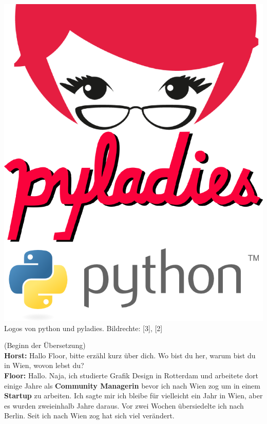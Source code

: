 \documentclass[10pt,a4paper,ngerman,twoside]{article} %
\begin{document}
\begin{multicols}{3}
\begin{center}
\includegraphics[width=\linewidth]{floor/floorlogo.png} \\
\footnotesize{Logos von python und pyladies. Bildrechte: [3], [2]}
\end{center}

(Beginn der Übersetzung) \\
\textbf{Horst:} Hallo Floor, bitte erzähl kurz über dich. Wo bist du her, warum bist du in Wien, wovon lebst du? \\
\textbf{Floor:} Hallo. Naja, ich studierte Grafik Design in Rotterdam und arbeitete dort einige Jahre als \textbf{Community Managerin} bevor ich nach Wien zog um in einem \textbf{Startup} zu arbeiten.  Ich sagte mir ich bleibe für vielleicht ein Jahr in Wien, aber es wurden zweieinhalb Jahre daraus. Vor zwei Wochen übersiedelte ich nach Berlin. Seit ich nach Wien zog hat sich viel verändert. 


\end{multicols}
\end{document}
